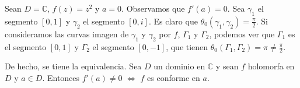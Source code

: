 \begin{example}[Contraejemplo]
    Sean $D = \mathbb{C}$, $f(z) = z^2$ y $a = 0$.
    Observamos que $f'(a) = 0$.
    Sea $\gamma_1$ el segmento $[0, 1]$ y $\gamma_2$ el segmento $[0, i]$.
    Es claro que $\theta_0(\gamma_1, \gamma_2) = \frac{\pi}{2}$.
    Si consideramos las curvas imagen de $\gamma_1$ y $\gamma_2$ por $f$, $\Gamma_1$ y $\Gamma_2$, podemos ver que $\Gamma_1$ es el segmento $[0, 1]$ y $\Gamma_2$ el segmento $[0, -1]$, que tienen $\theta_0(\Gamma_1, \Gamma_2) = \pi \neq \frac{\pi}{2}$.
\end{example}

De hecho, se tiene la equivalencia.
Sea $D$ un dominio en $\mathbb{C}$ y sean $f$ holomorfa en $D$ y $a \in D$.
Entonces $f'(a) \neq 0$ $\Leftrightarrow$ $f$ es conforme en $a$.